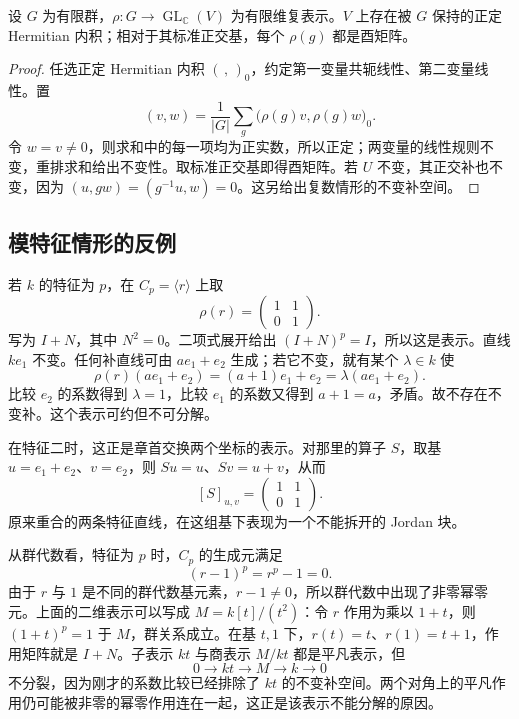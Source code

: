\begin{proposition}\label{b5:prop:unitary-average}
	设 \(G\) 为有限群，\(\rho:G\to\operatorname{GL}_{\mathbb C}(V)\) 为有限维复表示。\(V\) 上存在被 \(G\) 保持的正定 Hermitian 内积；相对于其标准正交基，每个 \(\rho(g)\) 都是酉矩阵。
\end{proposition}
\begin{proof}
	任选正定 Hermitian 内积 \((\, ,\,)_0\)，约定第一变量共轭线性、第二变量线性。置
	\[
		(v,w)=\frac1{|G|}\sum_g\bigl(\rho(g)v,\rho(g)w\bigr)_0.
	\]
	令 \(w=v\ne0\)，则求和中的每一项均为正实数，所以正定；两变量的线性规则不变，重排求和给出不变性。取标准正交基即得酉矩阵。若 \(U\) 不变，其正交补也不变，因为 \((u,gw)=(g^{-1}u,w)=0\)。这另给出复数情形的不变补空间。
\end{proof}

\subsection{模特征情形的反例}
\label{b5:subsec:0103:03}

若 \(k\) 的特征为 \(p\)，在 \(C_p=\langle r\rangle\) 上取
\[
	\rho(r)=\begin{pmatrix}1&1\\0&1\end{pmatrix}.
\]
写为 \(I+N\)，其中 \(N^2=0\)。二项式展开给出 \((I+N)^p=I\)，所以这是表示。直线 \(ke_1\) 不变。任何补直线可由 \(ae_1+e_2\) 生成；若它不变，就有某个 \(\lambda\in k\) 使
\[
	\rho(r)(ae_1+e_2)=(a+1)e_1+e_2 =\lambda(ae_1+e_2).
\]
比较 \(e_2\) 的系数得到 \(\lambda=1\)，比较 \(e_1\) 的系数又得到 \(a+1=a\)，矛盾。故不存在不变补。这个表示可约但不可分解。

\ProseParagraphBreak
在特征二时，这正是章首交换两个坐标的表示。对那里的算子 \(S\)，取基 \(u=e_1+e_2\)、\(v=e_2\)，则 \(Su=u\)、\(Sv=u+v\)，从而
\[
	[S]_{u,v}=\begin{pmatrix}1&1\\0&1\end{pmatrix}.
\]
原来重合的两条特征直线，在这组基下表现为一个不能拆开的 Jordan 块。

\ProseParagraphBreak
从群代数看，特征为 \(p\) 时，\(C_p\) 的生成元满足
\[
	(r-1)^p=r^p-1=0.
\]
由于 \(r\) 与 \(1\) 是不同的群代数基元素，\(r-1\ne0\)，所以群代数中出现了非零幂零元。上面的二维表示可以写成 \(M=k[t]/(t^2)\)：令 \(r\) 作用为乘以 \(1+t\)，则 \((1+t)^p=1\) 于 \(M\)，群关系成立。在基 \(t,1\) 下，\(r(t)=t\)、\(r(1)=t+1\)，作用矩阵就是 \(I+N\)。子表示 \(kt\) 与商表示 \(M/kt\) 都是平凡表示，但
\[
	0\longrightarrow kt\longrightarrow M\longrightarrow k\longrightarrow0
\]
不分裂，因为刚才的系数比较已经排除了 \(kt\) 的不变补空间。两个对角上的平凡作用仍可能被非零的幂零作用连在一起，这正是该表示不能分解的原因。

